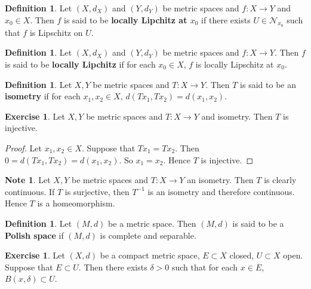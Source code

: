 \documentclass[12pt]{amsart}
\theoremstyle{definition}
\newtheorem{defn}[definition]{Definition}
\newtheorem{note}[definition]{Note}
\newtheorem{ex}[definition]{Exercise}
\newcommand{\del}{\delta}
\newcommand{\MN}{\mathcal{N}}
\newcommand{\lex}[1]{\label{ex:#1}}
\newcommand{\ld}[1]{\label{defn:#1}}
\begin{document}
	\begin{defn} \ld{}
	Let $(X, d_X)$ and $(Y, d_Y)$ be metric spaces and $f: X \rightarrow Y$ and $x_0 \in X$. Then $f$ is said to be \textbf{locally Lipchitz at $x_0$} if there exists $U \in \MN_{x_0}$ such that $f$ is Lipschitz on $U$.
	\end{defn}
	
	\begin{defn} \ld{}
	Let $(X, d_X)$ and $(Y, d_Y)$ be metric spaces and $f: X \rightarrow Y$. Then $f$ is said to be \textbf{locally Lipchitz} if for each $x_0 \in X$, $f$ is locally Lipschitz at $x_0$.
	\end{defn}
	
	
	\begin{defn} \ld{}
		Let $X, Y$ be metric spaces and $T : X \rightarrow Y$. Then $T$ is said to be an \textbf{isometry} if for each $x_1, x_2 \in X$, $d( Tx_1, Tx_2) = d(x_1,x_2) $.
	\end{defn}
	
	\begin{ex} \lex{}
		Let $X,Y$ be metric spaces and $T:X \rightarrow Y$ and isometry. Then $T$ is injective.
	\end{ex}
	
	\begin{proof}
		Let $x_1, x_2 \in X$. Suppose that $Tx_1=Tx_2$. Then $0= d( Tx_1, Tx_2) = d(x_1,x_2)$. So $x_1 = x_2$. Hence $T$ is injective.
	\end{proof}
	
	\begin{note}
		Let $X,Y$ be metric spaces and $T:X \rightarrow Y$ an isometry. Then $T$ is clearly continuous. If $T$ is surjective, then $T^{-1}$ is an isometry and therefore continuous. Hence $T$ is a homeomorphism.
	\end{note}
	
	\begin{defn} \ld{}
	Let $(M,d)$ be a metric space. Then $(M,d)$ is said to be a \textbf{Polish space} if $(M,d)$ is complete and separable. 
	\end{defn}
	
	
	
	\begin{ex} \lex{}
	Let $(X, d)$ be a compact metric space, $E \subset X$ closed, $U \subset X$ open. Suppose that $E \subset U$. Then there exists $\del >0$ such that for each $x \in E$, $B(x, \del) \subset U$.
	\end{ex}	
	
\end{document}
